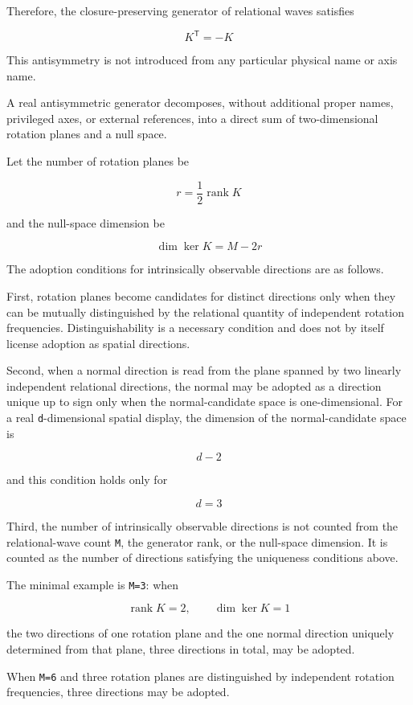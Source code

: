 \documentclass[
  a4paper,
]{article}
\begin{document}
Therefore, the closure-preserving generator of relational waves
satisfies

\[
K^{\mathsf T}=-K
\]

This antisymmetry is not introduced from any particular physical name or
axis name.

A real antisymmetric generator decomposes, without additional proper
names, privileged axes, or external references, into a direct sum of
two-dimensional rotation planes and a null space.

Let the number of rotation planes be

\[
r=\frac12\operatorname{rank}K
\]

and the null-space dimension be

\[
\dim\ker K=M-2r
\]

The adoption conditions for intrinsically observable directions are as
follows.

First, rotation planes become candidates for distinct directions only
when they can be mutually distinguished by the relational quantity of
independent rotation frequencies. Distinguishability is a necessary
condition and does not by itself license adoption as spatial directions.

Second, when a normal direction is read from the plane spanned by two
linearly independent relational directions, the normal may be adopted as
a direction unique up to sign only when the normal-candidate space is
one-dimensional. For a real \texttt{d}-dimensional spatial display, the
dimension of the normal-candidate space is

\[
d-2
\]

and this condition holds only for

\[
d=3
\]

Third, the number of intrinsically observable directions is not counted
from the relational-wave count \texttt{M}, the generator rank, or the
null-space dimension. It is counted as the number of directions
satisfying the uniqueness conditions above.

The minimal example is \texttt{M=3}: when

\[
\operatorname{rank}K=2,
\qquad
\dim\ker K=1
\]

the two directions of one rotation plane and the one normal direction
uniquely determined from that plane, three directions in total, may be
adopted.

When \texttt{M=6} and three rotation planes are distinguished by
independent rotation frequencies, three directions may be adopted.
\end{document}
